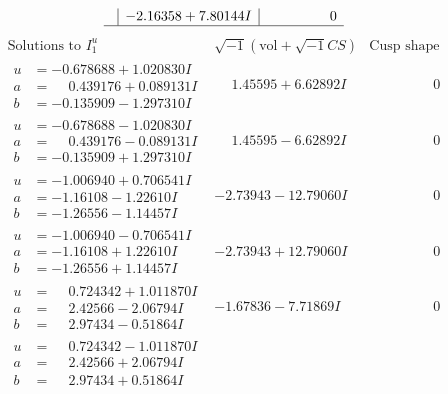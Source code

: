 \documentclass[1p]{elsarticle_modified}
\theoremstyle{definition}
\newcommand{\I}{\sqrt{-1}}
\begin{document}
$$\begin{array}{c|c|c}
 & -2.16358 + 7.80144 I & \phantom{-0.000000 } 0\\
 \hline 
 \end{array}$$\newpage$$\begin{array}{c|c|c}  
\text{Solutions to }I^u_{1}& \I (\text{vol} + \sqrt{-1}CS) & \text{Cusp shape}\\
 \hline 
\begin{aligned}
u &= -0.678688 + 1.020830 I \\
a &= \phantom{-}0.439176 + 0.089131 I \\
b &= -0.135909 - 1.297310 I\end{aligned}
 & \phantom{-}1.45595 + 6.62892 I & \phantom{-0.000000 } 0 \\ \hline\begin{aligned}
u &= -0.678688 - 1.020830 I \\
a &= \phantom{-}0.439176 - 0.089131 I \\
b &= -0.135909 + 1.297310 I\end{aligned}
 & \phantom{-}1.45595 - 6.62892 I & \phantom{-0.000000 } 0 \\ \hline\begin{aligned}
u &= -1.006940 + 0.706541 I \\
a &= -1.16108 - 1.22610 I \\
b &= -1.26556 - 1.14457 I\end{aligned}
 & -2.73943 - 12.79060 I & \phantom{-0.000000 } 0 \\ \hline\begin{aligned}
u &= -1.006940 - 0.706541 I \\
a &= -1.16108 + 1.22610 I \\
b &= -1.26556 + 1.14457 I\end{aligned}
 & -2.73943 + 12.79060 I & \phantom{-0.000000 } 0 \\ \hline\begin{aligned}
u &= \phantom{-}0.724342 + 1.011870 I \\
a &= \phantom{-}2.42566 - 2.06794 I \\
b &= \phantom{-}2.97434 - 0.51864 I\end{aligned}
 & -1.67836 - 7.71869 I & \phantom{-0.000000 } 0 \\ \hline\begin{aligned}
u &= \phantom{-}0.724342 - 1.011870 I \\
a &= \phantom{-}2.42566 + 2.06794 I \\
b &= \phantom{-}2.97434 + 0.51864 I\end{aligned}

\end{array}$$
\end{document}
